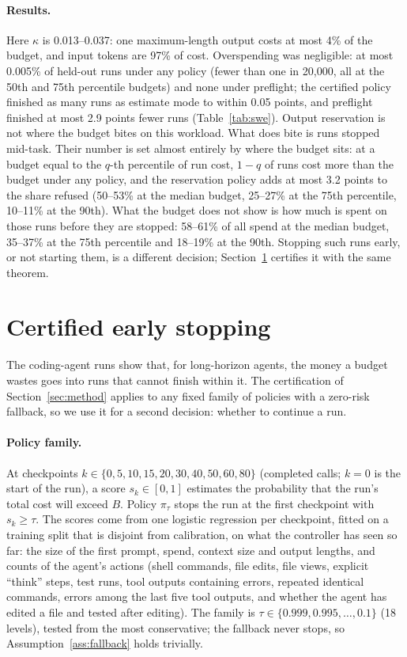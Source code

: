 \documentclass[11pt]{article}
\theoremstyle{remark}
\begin{document}
\paragraph{Results.}
Here $\kappa$ is 0.013--0.037: one maximum-length output costs at most
4\% of the budget, and input tokens are 97\% of cost. Overspending was
negligible: at most 0.005\% of held-out runs under any policy (fewer than one in
20{,}000, all at the 50th and 75th percentile budgets) and none under preflight;
the certified policy finished as many runs as estimate mode to within 0.05
points, and preflight finished at most 2.9 points fewer runs
(Table~\ref{tab:swe}). Output reservation is not where the budget bites on this
workload. What does bite is runs stopped mid-task. Their number is set almost
entirely by where the budget sits: at a budget equal to the $q$-th percentile of
run cost, $1-q$ of runs cost more than the budget under any policy, and the
reservation policy adds at most 3.2 points to the share refused (50--53\% at the
median budget, 25--27\% at the 75th percentile, 10--11\% at the 90th). What the
budget does not show is how much is spent on those runs before they are
stopped: 58--61\% of all spend at the median budget, 35--37\% at the 75th
percentile and 18--19\% at the 90th. Stopping such runs early, or not starting them, is a
different decision; Section~\ref{sec:early} certifies it with the same
theorem.

\section{Certified early stopping}\label{sec:early}

The coding-agent runs show that, for long-horizon agents, the money a budget
wastes goes into runs that cannot finish within it. The certification of
Section~\ref{sec:method} applies to any fixed family of policies with a
zero-risk fallback, so we use it for a second decision: whether to continue a
run.

\paragraph{Policy family.}
At checkpoints $k \in \{0, 5, 10, 15, 20, 30, 40, 50, 60, 80\}$ (completed
calls; $k = 0$ is the start of the run), a score $s_k \in [0,1]$ estimates the
probability that the run's total cost will exceed $B$. Policy $\pi_\tau$ stops
the run at the first checkpoint with $s_k \ge \tau$. The scores come from one
logistic regression per checkpoint, fitted on a training split that is
disjoint from calibration, on what the controller has seen so far: the size of
the first prompt, spend, context size and output lengths, and counts of the
agent's actions (shell commands, file edits, file views, explicit
``think'' steps, test runs, tool outputs containing errors, repeated identical
commands, errors among the last five tool outputs, and whether the agent has
edited a file and tested after editing). The family is
$\tau \in \{0.999, 0.995, \dots, 0.1\}$ (18 levels), tested from the most
conservative; the fallback never stops, so Assumption~\ref{ass:fallback} holds
trivially.
\end{document}
